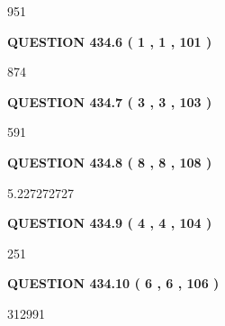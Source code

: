 \documentclass{ctexart}
\begin{document}
951
 
 
  
\vspace{0.2in}
  
{\textbf{\Large{QUESTION
434.6 
 ( 1 , 1 , 101 )
}}}
  
  
 
 
\noindent{}

874
 
 
  
\vspace{0.2in}
  
{\textbf{\Large{QUESTION
434.7 
 ( 3 , 3 , 103 )
}}}
  
  
 
 
\noindent{}

591
 
 
  
\vspace{0.2in}
  
{\textbf{\Large{QUESTION
434.8 
 ( 8 , 8 , 108 )
}}}
  
  
 
 
\noindent{}

5.227272727
 
 
  
\vspace{0.2in}
  
{\textbf{\Large{QUESTION
434.9 
 ( 4 , 4 , 104 )
}}}
  
  
 
 
\noindent{}

251
 
 
  
\vspace{0.2in}
  
{\textbf{\Large{QUESTION
434.10 
 ( 6 , 6 , 106 )
}}}
  
  
 
 
\noindent{}

312991
 
 
   
   
 \vspace{0.2in}
 
   
   
   
   
\end{document}
